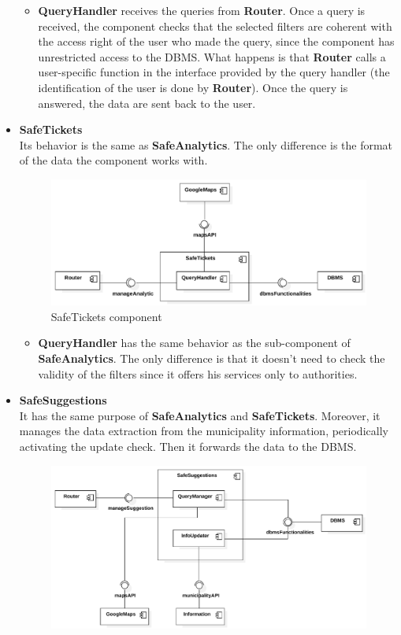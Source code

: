 \documentclass[./main.tex]{subfiles}
\begin{document}
\begin{itemize}
\begin{itemize}
  \item
    \textbf{QueryHandler} receives the queries from \textbf{Router}. Once a
    query is received, the component checks that the selected filters are
    coherent with the access right of the user who made the query, since the
    component has unrestricted access to the DBMS. What happens is that
    \textbf{Router} calls a user-specific function in the interface provided by
    the query handler (the identification of the user is done by
    \textbf{Router}). Once the query is answered, the data are sent back to the
    user.
  \end{itemize}
\item
  \textbf{SafeTickets}\\
  Its behavior is the same as \textbf{SafeAnalytics}. The only difference is
  the format of the data the component works with.
  \begin{figure}[H]
  \centering
  \includegraphics[width=\textwidth]{resources/component_diagram/component_diagram_safe_tickets}
  \caption{SafeTickets component}
  \end{figure}
  \begin{itemize}
  \item
    \textbf{QueryHandler} has the same behavior as the sub-component of
    \textbf{SafeAnalytics}. The only difference is that it doesn't need to
    check the validity of the filters since it offers his services only to
    authorities.
  \end{itemize}
\item
  \textbf{SafeSuggestions}\\
  It has the same purpose of \textbf{SafeAnalytics} and \textbf{SafeTickets}.
  Moreover, it manages the data extraction from the municipality information,
  periodically activating the update check. Then it forwards the data to the
  DBMS.
  \begin{figure}[H]
  \centering
  \includegraphics[width=\textwidth]{resources/component_diagram/component_diagram_safe_suggestions}

\end{figure}
\end{itemize}
\end{document}

